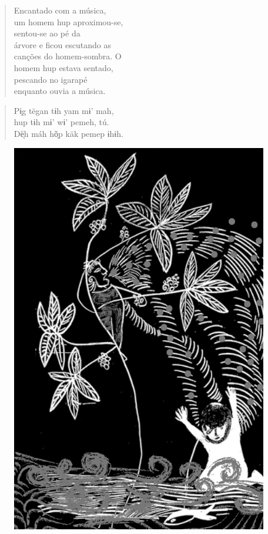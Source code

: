 \mbox{}\vspace*{\fill}

\begin{verse}
Encantado com a música,\\
um homem hup aproximou-se,\\
sentou-se ao pé da\\
árvore e ficou escutando as\\
canções do homem-sombra. O\\
homem hup estava sentado,\\
pescando no igarapé\\
enquanto ouvia a música.
\end{verse}

\begin{verse}
Pɨ̗g tëgan tɨh yam mɨ’ mah,\\
hup tɨh mɨ’ wɨ’ pemeh, tú.\\
Dë̖h máh hõ̖p käk pemep ɨhɨh.
\end{verse}

\vspace*{\fill}

\begin{figure}
\vspace*{-1.2cm}
\hspace*{-2.2cm}\includegraphics[width=138mm]{./imgs/img2.jpg}
\end{figure}


